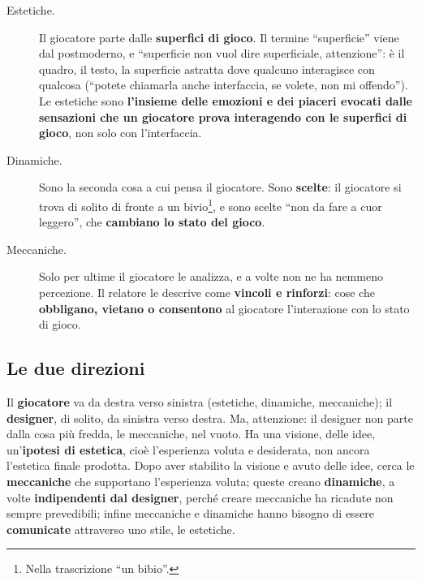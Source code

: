 \begin{description}
  \item[Estetiche.] Il giocatore parte dalle \textbf{superfici di gioco}.
        Il termine ``superficie'' viene dal postmoderno, e ``superficie non vuol
        dire superficiale, attenzione'': è il quadro, il testo, la superficie
        astratta dove qualcuno interagisce con qualcosa (``potete chiamarla anche
        interfaccia, se volete, non mi offendo''). Le estetiche sono
        \textbf{l'insieme delle emozioni e dei piaceri evocati dalle sensazioni
        che un giocatore prova interagendo con le superfici di gioco}, non solo
        con l'interfaccia.
  \item[Dinamiche.] Sono la seconda cosa a cui pensa il giocatore. Sono
        \textbf{scelte}: il giocatore si trova di solito di fronte a un
        bivio\footnote{Nella trascrizione ``un bibio''.}, e sono scelte
        ``non da fare a cuor leggero'', che \textbf{cambiano lo stato del
        gioco}.
  \item[Meccaniche.] Solo per ultime il giocatore le analizza, e a volte non
        ne ha nemmeno percezione. Il relatore le descrive come \textbf{vincoli e
        rinforzi}: cose che \textbf{obbligano, vietano o consentono} al giocatore
        l'interazione con lo stato di gioco.
\end{description}

\subsection{Le due direzioni}

Il \textbf{giocatore} va da destra verso sinistra (estetiche, dinamiche,
meccaniche); il \textbf{designer}, di solito, da sinistra verso destra. Ma,
attenzione: il designer non parte dalla cosa più fredda, le meccaniche, nel
vuoto. Ha una visione, delle idee, un'\textbf{ipotesi di estetica}, cioè
l'esperienza voluta e desiderata, non ancora l'estetica finale prodotta. Dopo
aver stabilito la visione e avuto delle idee, cerca le \textbf{meccaniche} che
supportano l'esperienza voluta; queste creano \textbf{dinamiche}, a volte
\textbf{indipendenti dal designer}, perché creare meccaniche ha ricadute non
sempre prevedibili; infine meccaniche e dinamiche hanno bisogno di essere
\textbf{comunicate} attraverso uno stile, le estetiche.

